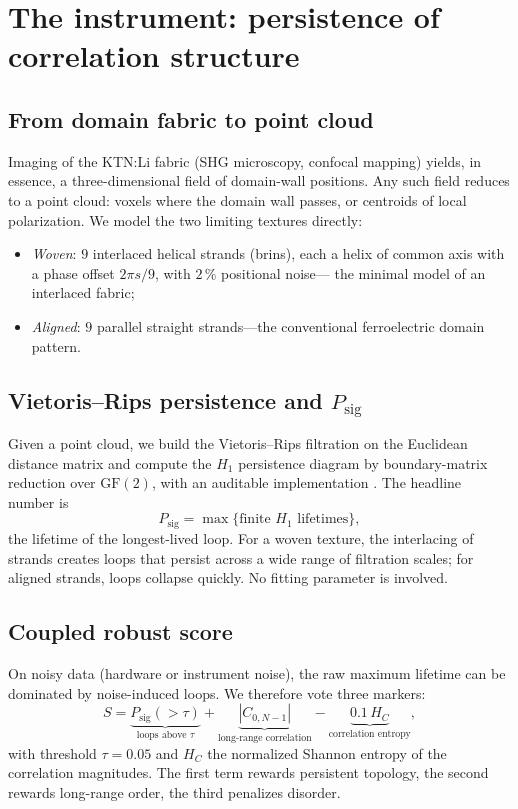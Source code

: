 \documentclass[11pt]{article}
\begin{document}
\section{The instrument: persistence of correlation structure}
\label{sec:model}

\subsection{From domain fabric to point cloud}

Imaging of the KTN:Li fabric (SHG microscopy, confocal mapping) yields, in
essence, a three-dimensional field of domain-wall positions. Any such field
reduces to a point cloud: voxels where the domain wall passes, or centroids
of local polarization. We model the two limiting textures directly:
\begin{itemize}
\item \emph{Woven}: $9$ interlaced helical strands (brins), each a helix of
common axis with a phase offset $2\pi s/9$, with $2\,\%$ positional noise---
the minimal model of an interlaced fabric;
\item \emph{Aligned}: $9$ parallel straight strands---the conventional
ferroelectric domain pattern.
\end{itemize}

\subsection{Vietoris--Rips persistence and $P_{\mathrm{sig}}$}

Given a point cloud, we build the Vietoris--Rips filtration on the Euclidean
distance matrix and compute the $H_1$ persistence diagram by boundary-matrix
reduction over $\mathrm{GF}(2)$, with an auditable implementation
\cite{repo}. The headline number is
\begin{equation}
P_{\mathrm{sig}} = \max\{\text{finite } H_1 \text{ lifetimes}\},
\label{eq:psig}
\end{equation}
the lifetime of the longest-lived loop. For a woven texture, the interlacing
of strands creates loops that persist across a wide range of filtration
scales; for aligned strands, loops collapse quickly. No fitting parameter is
involved.

\subsection{Coupled robust score}

On noisy data (hardware or instrument noise), the raw maximum lifetime can
be dominated by noise-induced loops. We therefore vote three markers:
\begin{equation}
S = \underbrace{P_{\mathrm{sig}}(>\!\tau)}_{\text{loops above }\tau} +
\underbrace{|C_{0,N-1}|}_{\text{long-range correlation}} -
\underbrace{0.1\, H_{C}}_{\text{correlation entropy}},
\label{eq:score}
\end{equation}
with threshold $\tau = 0.05$ and $H_{C}$ the normalized Shannon entropy of
the correlation magnitudes. The first term rewards persistent topology, the
second rewards long-range order, the third penalizes disorder.
\end{document}
